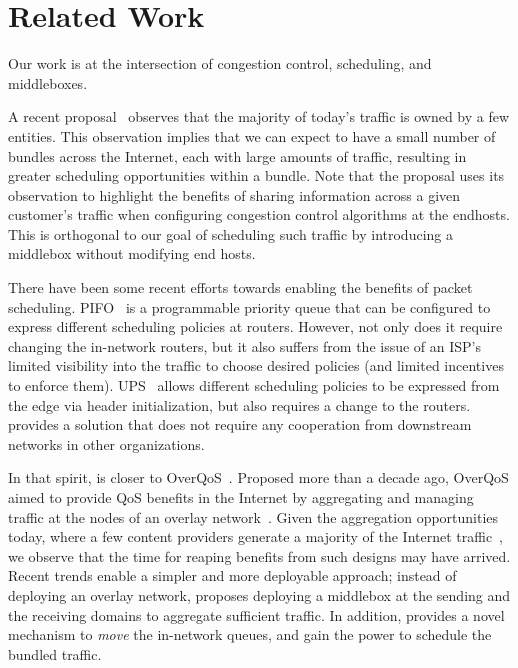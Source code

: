 \section{Related Work}
\label{s:related}

Our work is at the intersection of congestion control, scheduling, and middleboxes. 

 A recent proposal~\cite{fivecomps} observes that the majority of today's traffic is owned by a few entities.
This observation implies that we can expect to have a small number of bundles across the Internet, each with large amounts of traffic, resulting in greater scheduling opportunities within a bundle. Note that the proposal uses its observation to highlight the benefits of sharing information across a given customer's traffic when configuring congestion control algorithms at the endhosts. This is orthogonal to our goal of scheduling such traffic by introducing a middlebox without modifying end hosts.


 There have been some recent efforts towards enabling the benefits of packet scheduling. PIFO~\cite{pifo} is a programmable priority queue that can be configured to express different scheduling policies at routers. However, not only does it require changing the in-network routers, but it also suffers from the issue of an ISP's limited visibility into the traffic to choose desired policies (and limited incentives to enforce them). UPS~\cite{ups} allows different scheduling policies to be expressed from the edge via header initialization, but also requires a change to the routers.
\name provides a solution that does not require any cooperation from downstream networks in other organizations.

In that spirit, \name is closer to OverQoS~\cite{overqos}. Proposed more than a decade ago, OverQoS aimed to provide QoS benefits in the Internet by aggregating and managing traffic at the nodes of an overlay network~\cite{ron}. Given the aggregation opportunities today, where a few content providers generate a majority of the Internet traffic~\cite{fivecomps}, we observe that the time for reaping benefits from such designs may have arrived. Recent trends enable a simpler and more deployable approach; instead of deploying an overlay network, \name{} proposes deploying a middlebox at the sending and the receiving domains to aggregate sufficient traffic. In addition, \name provides a novel mechanism to \emph{move} the in-network queues, and gain the power to schedule the bundled traffic. 


